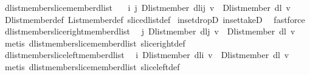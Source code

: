 \begin{isabellebody}
\endisatagproof
{\isafoldproof}%
%
\isadelimproof
\isanewline
%
\endisadelimproof
\isanewline
{}\isamarkupfalse%
\ dlist{\isacharunderscore}member{\isacharunderscore}slice{\isacharunderscore}member{\isacharunderscore}dlist{\isacharcolon}\isanewline
\ \ {\isachardoublequoteopen}{\isasymexists}\ i\ j{\isachardot}\ Dlist{\isachardot}member\ {\isacharparenleft}dl{\isasymdagger}i{\isachardot}{\isachardot}j{\isacharparenright}\ v\ {\isasymLongrightarrow}\ Dlist{\isachardot}member\ dl\ v{\isachardoublequoteclose}\isanewline
%
\isadelimproof
%
\endisadelimproof
%
\isatagproof
{}\isamarkupfalse%
\ Dlist{\isachardot}member{\isacharunderscore}def\ List{\isachardot}member{\isacharunderscore}def\ slice{\isacharunderscore}dlist{\isacharunderscore}def\isanewline
{}\isamarkupfalse%
\ in{\isacharunderscore}set{\isacharunderscore}dropD\ in{\isacharunderscore}set{\isacharunderscore}takeD\ \isamarkupfalse%
\ fastforce%
\endisatagproof
{\isafoldproof}%
%
\isadelimproof
\isanewline
%
\endisadelimproof
\isanewline
{}\isamarkupfalse%
\ dlist{\isacharunderscore}member{\isacharunderscore}slice{\isacharunderscore}right{\isacharunderscore}member{\isacharunderscore}dlist{\isacharcolon}\isanewline
\ \ {\isachardoublequoteopen}{\isasymexists}j{\isachardot}\ Dlist{\isachardot}member\ {\isacharparenleft}dl{\isasymdagger}{\isachardot}{\isachardot}j{\isacharparenright}\ v\ {\isasymLongrightarrow}\ Dlist{\isachardot}member\ dl\ v{\isachardoublequoteclose}\isanewline
%
\isadelimproof
%
\endisadelimproof
%
\isatagproof
{}\isamarkupfalse%
\ {\isacharparenleft}metis\ dlist{\isacharunderscore}member{\isacharunderscore}slice{\isacharunderscore}member{\isacharunderscore}dlist\ slice{\isacharunderscore}right{\isacharunderscore}def{\isacharparenright}%
\endisatagproof
{\isafoldproof}%
%
\isadelimproof
\isanewline
%
\endisadelimproof
\isanewline
{}\isamarkupfalse%
\ dlist{\isacharunderscore}member{\isacharunderscore}slice{\isacharunderscore}left{\isacharunderscore}member{\isacharunderscore}dlist{\isacharcolon}\isanewline
\ \ {\isachardoublequoteopen}{\isasymexists}i{\isachardot}\ Dlist{\isachardot}member\ {\isacharparenleft}dl{\isasymdagger}i{\isachardot}{\isachardot}{\isacharparenright}\ v\ {\isasymLongrightarrow}\ Dlist{\isachardot}member\ dl\ v{\isachardoublequoteclose}\isanewline
%
\isadelimproof
%
\endisadelimproof
%
\isatagproof
{}\isamarkupfalse%
\ {\isacharparenleft}metis\ dlist{\isacharunderscore}member{\isacharunderscore}slice{\isacharunderscore}member{\isacharunderscore}dlist\ slice{\isacharunderscore}left{\isacharunderscore}def{\isacharparenright}%

\end{isabellebody}
